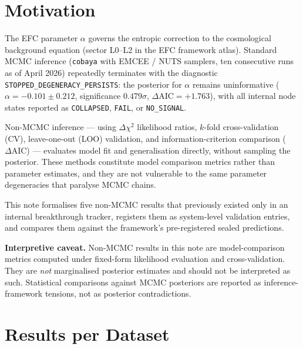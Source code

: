 \documentclass[11pt,a4paper]{article}
\begin{document}
\section{Motivation}

The EFC parameter $\alpha$ governs the entropic correction to the cosmological background equation (sector L0--L2 in the EFC framework atlas). Standard MCMC inference (\texttt{cobaya} with EMCEE / NUTS samplers, ten consecutive runs as of April 2026) repeatedly terminates with the diagnostic \texttt{STOPPED\_DEGENERACY\_PERSISTS}: the posterior for $\alpha$ remains uninformative ($\alpha = -0.101 \pm 0.212$, significance $0.479\sigma$, $\Delta\mathrm{AIC} = +1.763$), with all internal node states reported as \texttt{COLLAPSED}, \texttt{FAIL}, or \texttt{NO\_SIGNAL}.

Non-MCMC inference --- using $\Delta\chi^2$ likelihood ratios, $k$-fold cross-validation (CV), leave-one-out (LOO) validation, and information-criterion comparison ($\Delta\mathrm{AIC}$) --- evaluates model fit and generalisation directly, without sampling the posterior. These methods constitute model comparison metrics rather than parameter estimates, and they are not vulnerable to the same parameter degeneracies that paralyse MCMC chains.

This note formalises five non-MCMC results that previously existed only in an internal breakthrough tracker, registers them as system-level validation entries, and compares them against the framework's pre-registered sealed predictions.

\begin{warnbox}
\textbf{Interpretive caveat.} Non-MCMC results in this note are model-comparison metrics computed under fixed-form likelihood evaluation and cross-validation. They are \emph{not} marginalised posterior estimates and should not be interpreted as such. Statistical comparisons against MCMC posteriors are reported as inference-framework tensions, not as posterior contradictions.
\end{warnbox}

\section{Results per Dataset}
\end{document}
